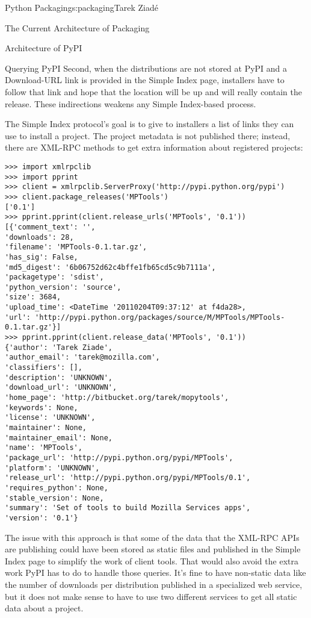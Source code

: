 \begin{aosachapter}{Python Packaging}{s:packaging}{Tarek Ziad\'{e}}
\begin{aosasect1}{The Current Architecture of Packaging}
\begin{aosasect2}{Architecture of PyPI}
\begin{aosasect3}{Querying PyPI}
Second, when the distributions are not stored at PyPI and a
Download-URL link is provided in the Simple Index page, installers
have to follow that link and hope that the location will be up and
will really contain the release. These indirections weakens any Simple
Index-based process.

The Simple Index protocol's goal is to give to installers a list of
links they can use to install a project. The project metadata is not
published there; instead, there are XML-RPC methods to get extra
information about registered projects:

\begin{verbatim}
>>> import xmlrpclib
>>> import pprint
>>> client = xmlrpclib.ServerProxy('http://pypi.python.org/pypi')
>>> client.package_releases('MPTools')
['0.1']
>>> pprint.pprint(client.release_urls('MPTools', '0.1'))
[{'comment_text': '',
'downloads': 28,
'filename': 'MPTools-0.1.tar.gz',
'has_sig': False,
'md5_digest': '6b06752d62c4bffe1fb65cd5c9b7111a',
'packagetype': 'sdist',
'python_version': 'source',
'size': 3684,
'upload_time': <DateTime '20110204T09:37:12' at f4da28>,
'url': 'http://pypi.python.org/packages/source/M/MPTools/MPTools-0.1.tar.gz'}]
>>> pprint.pprint(client.release_data('MPTools', '0.1'))
{'author': 'Tarek Ziade',
'author_email': 'tarek@mozilla.com',
'classifiers': [],
'description': 'UNKNOWN',
'download_url': 'UNKNOWN',
'home_page': 'http://bitbucket.org/tarek/mopytools',
'keywords': None,
'license': 'UNKNOWN',
'maintainer': None,
'maintainer_email': None,
'name': 'MPTools',
'package_url': 'http://pypi.python.org/pypi/MPTools',
'platform': 'UNKNOWN',
'release_url': 'http://pypi.python.org/pypi/MPTools/0.1',
'requires_python': None,
'stable_version': None,
'summary': 'Set of tools to build Mozilla Services apps',
'version': '0.1'}
\end{verbatim}

\noindent The issue with this approach is that some of the data that the XML-RPC
APIs are publishing could have been stored as static files and
published in the Simple Index page to simplify the work of client
tools.  That would also avoid the extra work PyPI has to do to handle
those queries.  It's fine to have non-static data like the number of
downloads per distribution published in a specialized web service, but
it does not make sense to have to use two different services to get
all static data about a project.

\end{aosasect3}

\end{aosasect2}


\end{aosasect1}
\end{aosachapter}
